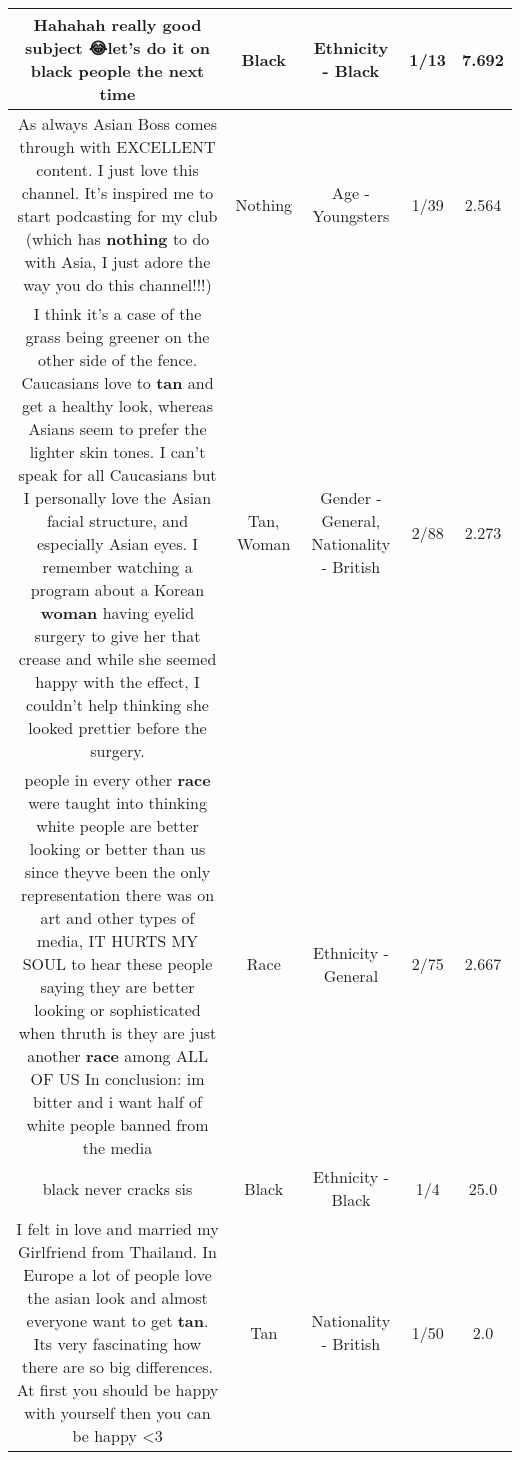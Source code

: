 \documentclass[11pt]{article}
\newlength\mylength
\begin{document}
\begin{center}
\begin{longtable}{|C{.65\mylength}|C{.30\mylength}|C{.12\mylength}|C{.12\mylength}|C{.12\mylength}|}
  \small Hahahah really good subject 😂let's do it on \textbf{black} people the next time\normalsize   & Black & Ethnicity - Black & 1/13 & 7.692 \\  \hline
  \small As always Asian Boss comes through with EXCELLENT content. I just love this channel. It's inspired me to start podcasting for my club (which has \textbf{nothing} to do with Asia, I just adore the way you do this channel!!!)\normalsize   & Nothing & Age - Youngsters & 1/39 & 2.564 \\  \hline
  \small I think it's a case of the grass being greener on the other side of the fence. Caucasians love to \textbf{tan} and get a healthy look, whereas Asians seem to prefer the lighter skin tones. I can't speak for all Caucasians but I  personally love the Asian facial structure, and especially Asian eyes. I remember watching a program about a Korean \textbf{woman} having eyelid surgery to give her that crease and while she seemed happy with the effect,  I couldn't help thinking she looked prettier before the surgery.\normalsize   & Tan, Woman & Gender - General, Nationality - British & 2/88 & 2.273 \\  \hline
  \small people in every other \textbf{race} were taught into thinking white people are better looking or better than us since theyve been the only representation there was on art and other types of media, IT HURTS MY SOUL to hear these people saying they are better looking or sophisticated when thruth is they are just another \textbf{race} among ALL OF US In conclusion: im bitter and i want half of white people banned from the media\normalsize   & Race & Ethnicity - General & 2/75 & 2.667 \\  \hline
  \small black never cracks sis\normalsize   & Black & Ethnicity - Black & 1/4 & 25.0 \\  \hline
  \small I felt in love and married my Girlfriend from Thailand. In Europe a lot of people love the asian look and almost everyone want to get \textbf{tan}. Its very fascinating how there are so big differences. At first you should be happy with yourself then you can be happy <3\normalsize   & Tan & Nationality - British & 1/50 & 2.0 \\  \hline

\end{longtable}
\end{center}
\end{document}
